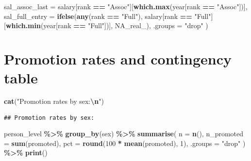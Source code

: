 \documentclass[
]{article}
\newenvironment{Shaded}{\begin{snugshade}}{\end{snugshade}}
\newcommand{\AttributeTok}[1]{\textcolor[rgb]{0.13,0.29,0.53}{#1}}
\newcommand{\ConstantTok}[1]{\textcolor[rgb]{0.56,0.35,0.01}{#1}}
\newcommand{\DecValTok}[1]{\textcolor[rgb]{0.00,0.00,0.81}{#1}}
\newcommand{\FunctionTok}[1]{\textcolor[rgb]{0.13,0.29,0.53}{\textbf{#1}}}
\newcommand{\NormalTok}[1]{#1}
\newcommand{\SpecialCharTok}[1]{\textcolor[rgb]{0.81,0.36,0.00}{\textbf{#1}}}
\newcommand{\StringTok}[1]{\textcolor[rgb]{0.31,0.60,0.02}{#1}}
\begin{document}
\begin{Shaded}
\begin{Highlighting}[]
    \AttributeTok{sal\_assoc\_last  =}\NormalTok{ salary[rank }\SpecialCharTok{==} \StringTok{"Assoc"}\NormalTok{][}\FunctionTok{which.max}\NormalTok{(year[rank }\SpecialCharTok{==} \StringTok{"Assoc"}\NormalTok{])],}
    \AttributeTok{sal\_full\_entry  =} \FunctionTok{ifelse}\NormalTok{(}\FunctionTok{any}\NormalTok{(rank }\SpecialCharTok{==} \StringTok{"Full"}\NormalTok{),}
\NormalTok{                             salary[rank }\SpecialCharTok{==} \StringTok{"Full"}\NormalTok{][}\FunctionTok{which.min}\NormalTok{(year[rank }\SpecialCharTok{==} \StringTok{"Full"}\NormalTok{])],}
                             \ConstantTok{NA\_real\_}\NormalTok{),}
    \AttributeTok{.groups =} \StringTok{"drop"}
\NormalTok{  )}
\end{Highlighting}
\end{Shaded}

\section{Promotion rates and contingency
table}\label{promotion-rates-and-contingency-table}

\begin{Shaded}
\begin{Highlighting}[]
\FunctionTok{cat}\NormalTok{(}\StringTok{"Promotion rates by sex:}\SpecialCharTok{\textbackslash{}n}\StringTok{"}\NormalTok{)}
\end{Highlighting}
\end{Shaded}

\begin{verbatim}
## Promotion rates by sex:
\end{verbatim}

\begin{Shaded}
\begin{Highlighting}[]
\NormalTok{person\_level }\SpecialCharTok{\%\textgreater{}\%}
  \FunctionTok{group\_by}\NormalTok{(sex) }\SpecialCharTok{\%\textgreater{}\%}
  \FunctionTok{summarise}\NormalTok{(}
    \AttributeTok{n          =} \FunctionTok{n}\NormalTok{(),}
    \AttributeTok{n\_promoted =} \FunctionTok{sum}\NormalTok{(promoted),}
    \AttributeTok{pct        =} \FunctionTok{round}\NormalTok{(}\DecValTok{100} \SpecialCharTok{*} \FunctionTok{mean}\NormalTok{(promoted), }\DecValTok{1}\NormalTok{),}
    \AttributeTok{.groups =} \StringTok{"drop"}
\NormalTok{  ) }\SpecialCharTok{\%\textgreater{}\%}
  \FunctionTok{print}\NormalTok{()}
\end{Highlighting}
\end{Shaded}
\end{document}
